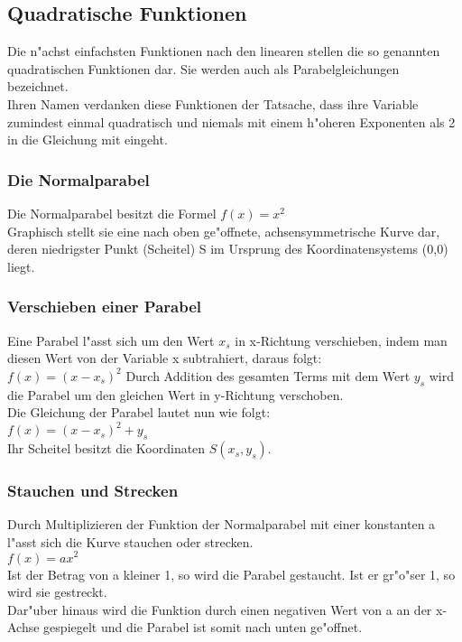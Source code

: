 \subsection{Quadratische Funktionen}
Die n"achst einfachsten Funktionen nach den linearen stellen die so genannten quadratischen Funktionen dar. Sie werden auch als Parabelgleichungen bezeichnet.\\
Ihren Namen verdanken diese Funktionen der Tatsache, dass ihre Variable zumindest einmal quadratisch und niemals mit einem h"oheren Exponenten als 2 in die Gleichung mit eingeht.\\

\subsubsection{Die Normalparabel}
Die Normalparabel besitzt die Formel $f(x) = x^2$\\
Graphisch stellt sie eine nach oben ge"offnete, achsensymmetrische Kurve dar, deren niedrigster Punkt (Scheitel) S im Ursprung des Koordinatensystems (0,0) liegt.

\subsubsection{Verschieben einer Parabel}
Eine Parabel l"asst sich um den Wert $x_s$ in x-Richtung verschieben, indem man diesen Wert von der Variable x subtrahiert, daraus folgt:\\
$f(x)=(x-x_s)^2$\vspace{0.25 cm}\flushleft
Durch Addition des gesamten Terms mit dem Wert $y_s$ wird die Parabel um den gleichen Wert in y-Richtung verschoben.\\
Die Gleichung der Parabel lautet nun wie folgt:\\
$f(x)=(x-x_s)^2+y_s$\\
Ihr Scheitel besitzt die Koordinaten $S(x_s,y_s)$.

\subsubsection{Stauchen und Strecken}
Durch Multiplizieren der Funktion der Normalparabel mit einer konstanten a l"asst sich die Kurve stauchen oder strecken.\\
$f(x)=ax^2$\\
Ist der Betrag von a kleiner 1, so wird die Parabel gestaucht. Ist er gr"o"ser 1, so wird sie gestreckt.\\
Dar"uber hinaus wird die Funktion durch einen negativen Wert von a an der x-Achse gespiegelt und die Parabel ist somit nach unten ge"offnet.

